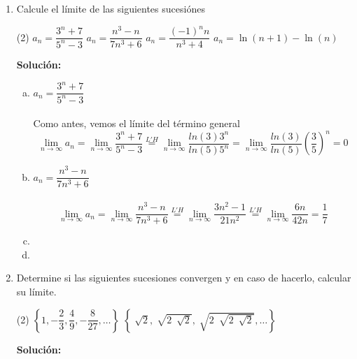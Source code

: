 \documentclass[12pt]{article}
\newenvironment{solucion}
{\begin{mdframed}[backgroundcolor=black!10]
		{\bf Solución:}\\
	}
	{
	\end{mdframed}
}
\newenvironment{preguntas}
{\begin{enumerate}\itemsep12pt
	}
	{
	\end{enumerate}
}
\newcommand{\ra}{\rightarrow}
\begin{document}
\begin{preguntas}
\item Calcule el límite de las siguientes sucesiónes
\begin{tasks}(2)
\task $a_n = \dfrac{3^n+7}{5^n-3}$
\task $a_n = \dfrac{n^3-n}{7n^3+6}$
\task $a_n = \dfrac{(-1)^n n}{n^3+4}$
\task $a_n=\ln(n+1)-\ln(n)$
\end{tasks}
\begin{solucion}

\begin{enumerate}[a)]
\item $a_n = \dfrac{3^n+7}{5^n-3}$\\
			\\
			Como antes, vemos el límite del término general
			$$\lim\limits_{n\ra \infty} a_n = \lim\limits_{n\ra \infty} \dfrac{3^n+7}{5^n-3} \stackrel{L'H}{=} \lim\limits_{n\ra \infty} \dfrac{ln(3)3^n}{ln(5)5^n} = \lim\limits_{n\ra \infty} \dfrac{ln(3)}{ln(5)} \left(\dfrac{3}{5}\right)^n = 0$$
\item $a_n = \dfrac{n^3-n}{7n^3+6}$\\
			\\
			$$\lim\limits_{n\ra \infty} a_n = \lim\limits_{n\ra \infty} \dfrac{n^3-n}{7n^3+6} \stackrel{L'H}{=} \lim\limits_{n\ra \infty} \dfrac{3n^2-1}{21n^2}
			\stackrel{L'H}{=} \lim\limits_{n\ra \infty} \dfrac{6n}{42n} = \dfrac{1}{7}$$
\item 
\item 
\end{enumerate}
\end{solucion}
\item Determine si las siguientes sucesiones convergen y en caso de hacerlo, calcular su límite.
\begin{tasks}(2)
\task $\left\{1, -\dfrac{2}{3}, \dfrac{4}{9}, -\dfrac{8}{27}, \dots \right\}$
\task $\left\{\sqrt[]{2}, \sqrt[]{2\ \sqrt[]{2}}, \sqrt[]{2\ \sqrt[]{2\ \sqrt[]{2}}}, \dots \right\}$
\end{tasks}
\begin{solucion}


\end{solucion}
\end{preguntas}
\end{document}
